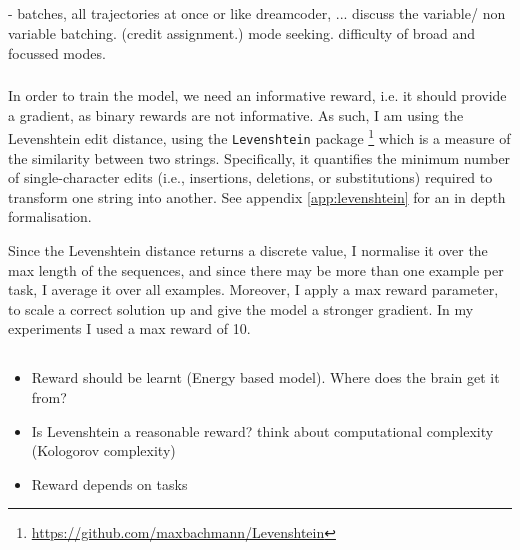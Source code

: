 \subsection{}\label{sec:credit}


- batches, all trajectories at once or like dreamcoder, ...
discuss the variable/ non variable batching. (credit assignment.)
mode seeking. difficulty of broad and focussed modes.




\subsubsection{}

In order to train the model, we need an informative reward, i.e. it should provide a gradient, as binary rewards are not informative. As such, I am using the Levenshtein edit distance, using the \texttt{Levenshtein} package \footnote{\url{https://github.com/maxbachmann/Levenshtein}} which is a measure of the similarity between two strings. Specifically, it quantifies the minimum number of single-character edits (i.e., insertions, deletions, or substitutions) required to transform one string into another. See appendix \ref{app:levenshtein} for an in depth formalisation.

Since the Levenshtein distance returns a discrete value, I normalise it over the max length of the sequences, and since there may be more than one example per task, I average it over all examples. Moreover, I apply a max reward parameter, to scale a correct solution up and give the model a stronger gradient. In my experiments I used a max reward of 10.



\subsection{}

\begin{itemize}
    \item Reward should be learnt (Energy based model). Where does the brain get it from?
    \item Is Levenshtein a reasonable reward? think about computational complexity (Kologorov complexity)
    \item Reward depends on tasks
\end{itemize}





